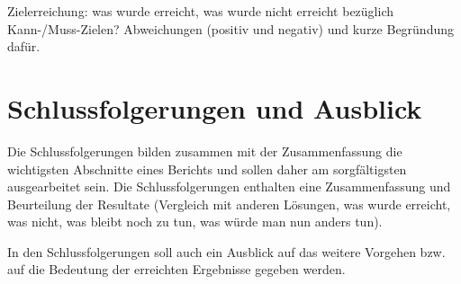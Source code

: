 Zielerreichung: was wurde erreicht, was wurde nicht erreicht bezüglich Kann-/Muss-Zielen? Abweichungen (positiv und negativ) und kurze Begründung dafür.

\section{Schlussfolgerungen und Ausblick}

Die Schlussfolgerungen bilden zusammen mit der Zusammenfassung die wichtigsten Abschnitte eines Berichts und sollen daher am sorgfältigsten ausgearbeitet sein. Die Schlussfolgerungen enthalten eine Zusammenfassung und Beurteilung der Resultate (Vergleich mit anderen Lösungen, was wurde erreicht, was nicht, was bleibt noch zu tun, was würde man nun anders tun).
 
In den Schlussfolgerungen soll auch ein Ausblick auf das weitere Vorgehen bzw. auf die Bedeutung der erreichten Ergebnisse gegeben werden.
